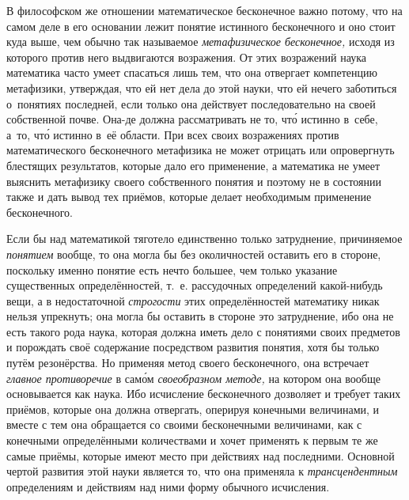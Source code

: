 В философском же отношении математическое бесконечное важно потому, что на
самом деле в его основании лежит понятие истинного бесконечного и оно стоит
куда выше, чем обычно так называемое {\em метафизическое бесконечное,} исходя
из которого против него выдвигаются возражения. От этих возражений наука
математика часто умеет спасаться лишь тем, что она отвергает компетенцию
метафизики, утверждая, что ей нет дела до этой науки, что ей нечего
заботиться о~понятиях последней, если только она действует последовательно
на своей собственной почве. Она-де должна рассматривать не то, чт\'{о}
истинно в~себе, а~то, чт\'{о} истинно в~её области. При
всех своих возражениях против математического бесконечного метафизика не
может отрицать или опровергнуть блестящих результатов, которые дало его
применение, а математика не умеет выяснить метафизику своего собственного
понятия и поэтому не в состоянии также и дать вывод тех приёмов, которые
делает необходимым применение бесконечного.

Если бы над математикой тяготело единственно только затруднение, причиняемое
{\em понятием} вообще, то она могла бы без околичностей оставить его в стороне,
поскольку именно понятие есть нечто большее, чем только указание существенных
определённостей, т.~е. рассудочных определений какой-нибудь вещи, а в
недостаточной {\em строгости} этих определённостей математику никак нельзя
упрекнуть; она могла бы оставить в стороне это затруднение, ибо она не есть
такого рода наука, которая должна иметь дело с понятиями своих предметов и
порождать своё содержание посредством развития понятия, хотя бы только путём
резонёрства. Но применяя метод своего бесконечного, она
встречает {\em главное противоречие} в сам\'{о}м {\em своеобразном методе,} на
котором она вообще основывается как наука. Ибо исчисление бесконечного дозволяет и
требует таких приёмов, которые она должна отвергать, оперируя конечными
величинами, и вместе с тем она обращается со своими бесконечными величинами,
как с конечными определёнными количествами и хочет применять к первым те же
самые приёмы, которые имеют место при действиях над последними. Основной чертой
развития этой науки является то, что она применяла к {\em трансцендентным}
определениям и действиям над ними форму обычного исчисления.

